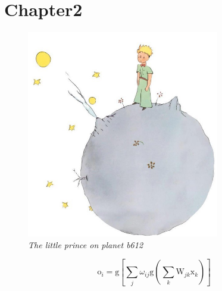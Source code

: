 \section{Chapter2}
		\label{sec:chapter2}

	\lipsum[1]

	\begin{figure} [H]
	 \centering
	  \includegraphics[width=0.75\textwidth]{02_body/chapter2/images/princeplanet.jpg}
		\caption[The little prince on planet b612]{\centering \textit{The little prince on planet b612}}
	  \label{fig:1}
	\end{figure}

	\lipsum[5-7]

	\begin{equation}
	\mathrm o_i= \mathrm g \left[\sum_{j}\omega_{ij}\mathrm g\left(\sum_{k}\mathrm W_{jk}\mathrm x_k\right)\right]
	\label{eq:5}
	\end{equation}
\newpage

